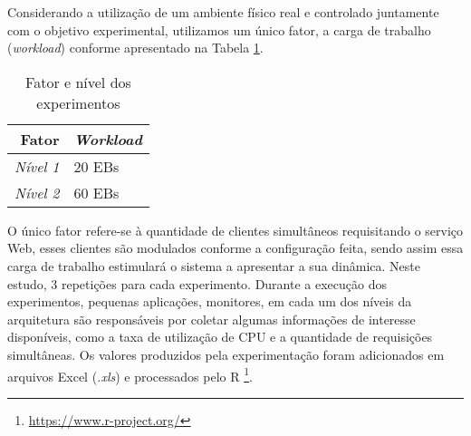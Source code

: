 Considerando a utilização de um ambiente físico real e controlado juntamente com o objetivo experimental, utilizamos um único fator, a carga de trabalho (\textit{workload}) conforme apresentado na Tabela \ref{tab:fatores_niveis}.
\begin{table}[htb]
	\centering
	\caption{Fator e nível dos experimentos}
	\label{tab:fatores_niveis}
	\begin{tabularx}{\textwidth}{|r|X|} \hline\hline
		\textbf{Fator}		& \textbf{\textit{Workload}} \\ \hline
		\textit{Nível 1}	&		20 EBs				 \\
		\textit{Nível 2}	&		60 EBs				 \\		
		\hline
	\end{tabularx}
	\fdadospesquisa
\end{table}

O único fator refere-se à quantidade de clientes simultâneos requisitando o serviço Web, esses clientes são modulados conforme a configuração feita, sendo assim essa carga de trabalho estimulará o sistema a apresentar a sua dinâmica. Neste estudo, 3 repetições para cada experimento.
Durante a execução dos experimentos, pequenas aplicações, monitores, em cada um dos níveis da arquitetura são responsáveis por coletar algumas informações de interesse disponíveis, como a taxa de utilização de CPU e a quantidade de requisições simultâneas. Os valores produzidos pela experimentação foram adicionados em arquivos Excel (\textit{.xls}) e processados pelo R \footnote{\url{https://www.r-project.org/}}.

